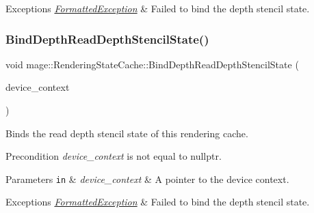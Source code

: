 \begin{DoxyExceptions}{Exceptions}
{\em \hyperlink{structmage_1_1_formatted_exception}{Formatted\+Exception}} & Failed to bind the depth stencil state. \\
\hline
\end{DoxyExceptions}
\hypertarget{structmage_1_1_rendering_state_cache_a0b0838c75ad5ed0b84741a111cd061c8}{}\label{structmage_1_1_rendering_state_cache_a0b0838c75ad5ed0b84741a111cd061c8} 
\subsubsection{\texorpdfstring{Bind\+Depth\+Read\+Depth\+Stencil\+State()}{BindDepthReadDepthStencilState()}}
{\footnotesize\ttfamily void mage\+::\+Rendering\+State\+Cache\+::\+Bind\+Depth\+Read\+Depth\+Stencil\+State (\begin{DoxyParamCaption}\item[{I\+D3\+D11\+Device\+Context2 $\ast$}]{device\+\_\+context }\end{DoxyParamCaption})}

Binds the read depth stencil state of this rendering cache.

\begin{DoxyPrecond}{Precondition}
{\itshape device\+\_\+context} is not equal to {\ttfamily nullptr}. 
\end{DoxyPrecond}

\begin{DoxyParams}[1]{Parameters}
\mbox{\tt in}  & {\em device\+\_\+context} & A pointer to the device context. \\
\hline
\end{DoxyParams}

\begin{DoxyExceptions}{Exceptions}
{\em \hyperlink{structmage_1_1_formatted_exception}{Formatted\+Exception}} & Failed to bind the depth stencil state. \\
\hline
\end{DoxyExceptions}
\hypertarget{structmage_1_1_rendering_state_cache_ad01ce1d0d09206ef1d47fb736663013e}{}\label{structmage_1_1_rendering_state_cache_ad01ce1d0d09206ef1d47fb736663013e} 
